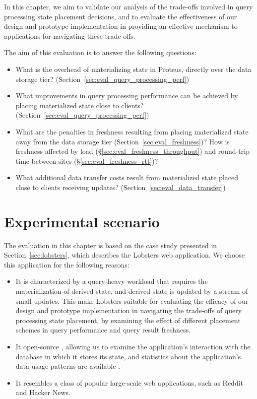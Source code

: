 In this chapter, we aim to validate our analysis of the trade-offs involved in query processing state placement decisions,
and to evaluate the effectiveness of our design and prototype implementation in providing an effective mechanism to applications
for navigating these trade-offs.

The aim of this evaluation is to answer the following questions:

\begin{itemize}

  \item What is the overhead of materializing state in Proteus, directly over the data storage tier?
  (Section~\ref{sec:eval_query_processing_perf})

  \item What improvements in query processing performance can be achieved by placing materialized state close to clients?
  (Section~\ref{sec:eval_query_processing_perf})

  \item What are the penalties in freshness resulting from placing materialized state away from the data storage tier
  (Section~\ref{sec:eval_freshness})?
  How is freshness affected by load (\S\ref{sec:eval_freshness_throughput}) and round-trip time between
  sites (\S\ref{sec:eval_freshness_rtt})?

  \item What additional data transfer costs result from materialized state placed close to clients receiving updates?
  (Section~\ref{sec:eval_data_transfer})

\end{itemize}

\section{Experimental scenario}
\label{sec:eval_scenario}

The evaluation in this chapter is based on the case study presented in Section~\ref{sec:lobsters},
which describes the Lobsters \cite{lobste:rs} web application.
We choose this application for the following reasons:
\begin{itemize}
\item It is characterized by a query-heavy workload that requires the materialization of derived state,
and derived state is updated by a stream of small updates.
This make Lobsters suitable for evaluating the efficacy of our design and prototype implementation in
navigating the trade-offs of query processing state placement,
by examining the effect of different placement schemes in query performance and query result freshness.

\item It open-source \cite{lobsters:source},
allowing us to examine the application's interaction with the database in which it stores its state,
and statistics about the application's data usage patterns are available \cite{lobste:stats}.

\item It resembles a class of popular large-scale web applications, such as Reddit and Hacker News.
\end{itemize}

